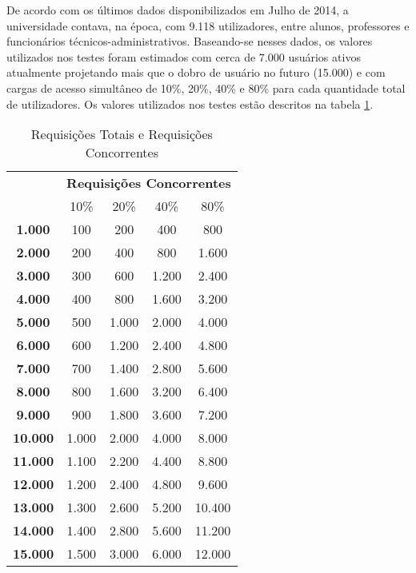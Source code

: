 De acordo com os últimos dados disponibilizados em Julho de 2014, a 
universidade contava, na época, com 9.118 utilizadores, entre alunos, 
professores e funcionários técnicos-administrativos. Baseando-se nesses dados, 
os valores utilizados nos testes foram estimados com cerca de 7.000 usuários 
ativos atualmente projetando mais que o dobro de usuário no futuro (15.000) e 
com cargas de acesso simultâneo de 10\%, 20\%, 40\% e 80\% para cada quantidade 
total de utilizadores. Os valores utilizados nos testes estão descritos na 
tabela \ref{tab:requisicoes}.
\begin{table}[htb]
	\centering
	\ABNTEXfontereduzida
	\caption[Requisições Totais e Requisições Concorrentes]{Requisições Totais 
	e Requisições Concorrentes}
	\label{tab:requisicoes}
		\begin{tabular}{|>{\bfseries}c|c|c|c|c|}
		\hline
		\multirow{2}{*}{Requisições Totais} & 
		\multicolumn{4}{c|}{\textbf{Requisições 
		Concorrentes}} \\ \cline{2-5}
		& 10\%      & 20\%  & 40\%  & 80\%  \\ \hline
		1.000  & 100   & 200   & 400   & 800   \\ \hline
		2.000  & 200   & 400   & 800   & 1.600  \\ \hline
		3.000  & 300   & 600   & 1.200 & 2.400  \\ \hline
		4.000  & 400   & 800   & 1.600 & 3.200  \\ \hline
		5.000  & 500   & 1.000 & 2.000 & 4.000  \\ \hline
		6.000  & 600   & 1.200 & 2.400 & 4.800  \\ \hline
		7.000  & 700   & 1.400 & 2.800 & 5.600  \\ \hline
		8.000  & 800   & 1.600 & 3.200 & 6.400  \\ \hline
		9.000  & 900   & 1.800 & 3.600 & 7.200  \\ \hline
		10.000 & 1.000 & 2.000 & 4.000 & 8.000  \\ \hline
		11.000 & 1.100 & 2.200 & 4.400 & 8.800  \\ \hline
		12.000 & 1.200 & 2.400 & 4.800 & 9.600  \\ \hline
		13.000 & 1.300 & 2.600 & 5.200 & 10.400 \\ \hline
		14.000 & 1.400 & 2.800 & 5.600 & 11.200 \\ \hline
		15.000 & 1.500 & 3.000 & 6.000 & 12.000 \\ \hline
		\end{tabular}
\end{table}


